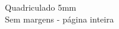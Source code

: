 \documentclass[a4paper]{article}
\begin{document}
	\pagestyle{empty}
	
	\vspace*{8cm}
	\begin{center}
		{\Huge Quadriculado 5mm}\\[0.5cm]
		{\Large Sem margens - página inteira}
	\end{center}
	
\end{document}
